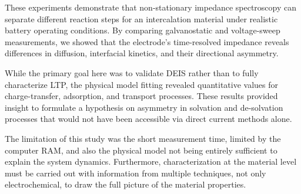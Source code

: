These experiments demonstrate that non-stationary impedance spectroscopy can separate different reaction steps for an intercalation material under realistic battery operating conditions.
By comparing galvanostatic and voltage-sweep measurements, we showed that the electrode's time-resolved impedance reveals differences in diffusion, interfacial kinetics, and their directional asymmetry. 

While the primary goal here was to validate DEIS rather than to fully characterize LTP, the physical model fitting revealed quantitative values for charge-transfer, adsorption, and transport processes. These results provided insight to formulate a hypothesis on asymmetry in solvation and de-solvation processes that would not have been accessible via direct current methods alone. 

The limitation of this study was the short measurement time, limited by the computer RAM, and also the physical model not being entirely sufficient to explain the system dynamics. Furthermore, characterization at the material level must be carried out with information from multiple techniques, not only electrochemical, to draw the full picture of the material properties.





